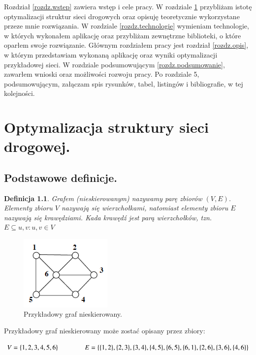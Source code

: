 \documentclass[twoside,12pt]{report}
\newtheorem{definition}{Definicja} %
\let\oldsection\chapter
\def\chapter{\cleardoublepage\oldsection}
\begin{document}
Rozdział \ref{rozdz.wstep} zawiera wstęp i cele pracy. W rozdziale \ref{rozdz.optymalizacja} przybliżam istotę optymalizacji struktur sieci drogowych
oraz opisuję teoretycznie wykorzystane przeze mnie rozwiązania. W rozdziale \ref{rozdz.technologie} wymieniam technologie, w których wykonałem aplikację oraz przybliżam zewnętrzne biblioteki, o które oparłem swoje rozwiązanie. Głównym rozdziałem pracy jest rozdział \ref{rozdz.opis},
w którym przedstawiam wykonaną aplikację oraz wyniki optymalizacji przykładowej sieci. W rozdziale podsumowującym \ref{rozdz.podsumowanie}, zawarłem wnioski oraz możliwości rozwoju pracy. Po rozdziale 5, podsumowującym, załączam spis rysunków, tabel, listingów i bibliografie, w tej kolejności.

\chapter{Optymalizacja struktury sieci drogowej.}\label{rozdz.optymalizacja} 
\section{Podstawowe definicje.}

\begin{definition}\label{Graf nieskierowany}
Grafem (nieskierowanym) nazywamy parę zbiorów $(V,E)$. Elementy zbioru $V$ nazywają się \textit{wierzchołkami}, natomiast elementy zbioru $E$ nazywają się \textit{krawędziami}. Kada krawędź jest parą wierzchołków, tzn. $E \subseteq {{u,v}:u,v \in V}$
\end{definition}

\begin{figure}[ht]
\begin{center}
\includegraphics[width=0.40\textwidth]{img/graf1}
\caption{Przykładowy graf nieskierowany\cite{grafy}.} 
\end{center}
\end{figure}

Przykładowy graf nieskierowany może zostać opisany przez zbiory:
\begin{center}
\begin{math}
V=\{1,2,3,4,5,6\} \hspace*{40px} E=\{\{1,2\},\{2,3\},\{3,4\},\{4,5\},\{6,5\},\{6,1\},\{2,6\},\{3,6\},\{4,6\}\}
\end{math}
\end{center}
\end{document}
